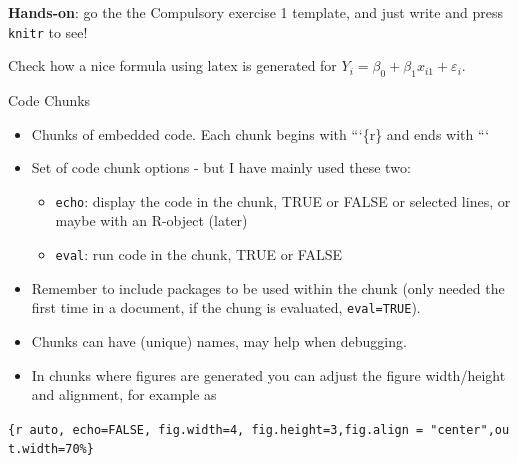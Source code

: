\documentclass[
  10pt,
  ignorenonframetext,
]{beamer}
\providecommand{\tightlist}{%
  \setlength{\itemsep}{0pt}\setlength{\parskip}{0pt}}
\begin{document}
\begin{frame}[fragile]
\textbf{Hands-on}: go the the Compulsory exercise 1 template, and just
write and press \texttt{knitr} to see!

Check how a nice formula using latex is generated for
\(Y_i=\beta_0+\beta_1 x_{i1} +\varepsilon_i\).
\end{frame}

\begin{frame}[fragile]
\begin{block}{Code Chunks}
\protect\hypertarget{code-chunks}{}
\(~\)

\begin{itemize}
\tightlist
\item
  Chunks of embedded code. Each chunk begins with ```\{r\} and ends with
  ```
\end{itemize}

\vspace{2mm}

\begin{itemize}
\tightlist
\item
  Set of code chunk options - but I have mainly used these two:

  \begin{itemize}
  \tightlist
  \item
    \texttt{echo}: display the code in the chunk, TRUE or FALSE or
    selected lines, or maybe with an R-object (later)
  \item
    \texttt{eval}: run code in the chunk, TRUE or FALSE
  \end{itemize}
\end{itemize}

\vspace{2mm}

\begin{itemize}
\tightlist
\item
  Remember to include packages to be used within the chunk (only needed
  the first time in a document, if the chung is evaluated,
  \texttt{eval=TRUE}).
\end{itemize}

\vspace{2mm}

\begin{itemize}
\tightlist
\item
  Chunks can have (unique) names, may help when debugging.
\end{itemize}

\vspace{2mm}

\begin{itemize}
\tightlist
\item
  In chunks where figures are generated you can adjust the figure
  width/height and alignment, for example as
\end{itemize}

\texttt{\{r\ auto,\ echo=FALSE,\ fig.width=4,\ fig.height=3,fig.align\ =\ "center",out.width=\textquotesingle{}70\%\textquotesingle{}\}}
\end{block}
\end{frame}
\end{document}
